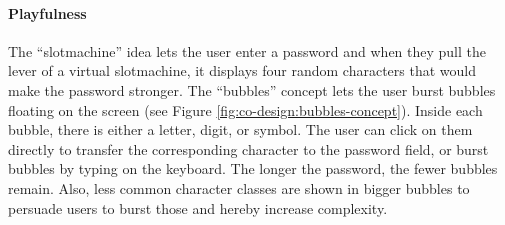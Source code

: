 \paragraph{Playfulness} The ``slotmachine'' idea lets the user enter a password and when they pull the lever of a virtual slotmachine, it displays four random characters that would make the password stronger. The ``bubbles'' concept lets the user burst bubbles floating on the screen (see Figure \ref{fig:co-design:bubbles-concept}). Inside each bubble, there is either a letter, digit, or symbol. The user can click on them directly to transfer the corresponding character to the password field, or burst bubbles by typing on the keyboard. The longer the password, the fewer bubbles remain. Also, less common character classes are shown in bigger bubbles to persuade users to burst those and hereby increase complexity. 

